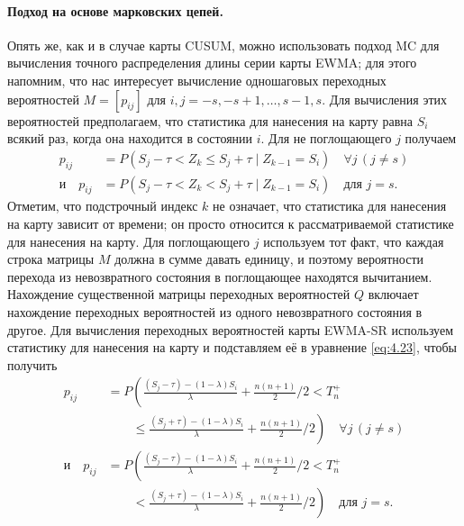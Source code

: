 \paragraph{Подход на основе марковских цепей.} Опять же, как и в случае карты CUSUM, можно использовать подход MC для вычисления точного распределения длины серии карты EWMA; для этого напомним, что нас интересует вычисление одношаговых переходных вероятностей \(M = [p_{ij}]\) для \(i, j = -s, -s + 1, \ldots, s - 1, s\). Для вычисления этих вероятностей предполагаем, что статистика для нанесения на карту равна \(S_i\) всякий раз, когда она находится в состоянии \(i\). Для не поглощающего \(j\) получаем
\begin{equation}
	\begin{aligned}
		p_{ij} &= P(S_j - \tau < Z_k \le S_j + \tau \mid Z_{k-1} = S_i) \quad \forall j\, (j \ne s) \\
		\text{и}\quad p_{ij} &= P(S_j - \tau < Z_k < S_j + \tau \mid Z_{k-1} = S_i) \quad \text{для } j = s.
	\end{aligned}
	\label{eq:4.23}
\end{equation}
Отметим, что подстрочный индекс \(k\) не означает, что статистика для нанесения на карту зависит от времени; он просто относится к рассматриваемой статистике для нанесения на карту. Для поглощающего \(j\) используем тот факт, что каждая строка матрицы \(M\) должна в сумме давать единицу, и поэтому вероятности перехода из невозвратного состояния в поглощающее находятся вычитанием. Нахождение существенной матрицы переходных вероятностей \(Q\) включает нахождение переходных вероятностей из одного невозвратного состояния в другое. Для вычисления переходных вероятностей карты EWMA-SR используем статистику для нанесения на карту и подставляем её в уравнение \eqref{eq:4.23}, чтобы получить
\begin{equation}
	\begin{aligned}
		p_{ij} &= P\left( \frac{(S_j - \tau) - (1 - \lambda)S_i}{\lambda} + \frac{n(n + 1)}{2} \Big/ 2 < T_n^+ \right. \\
		&\qquad \left. \le \frac{(S_j + \tau) - (1 - \lambda)S_i}{\lambda} + \frac{n(n + 1)}{2} \Big/ 2 \right) \quad \forall j\, (j \ne s) \\
		\text{и}\quad p_{ij} &= P\left( \frac{(S_j - \tau) - (1 - \lambda)S_i}{\lambda} + \frac{n(n + 1)}{2} \Big/ 2 < T_n^+ \right. \\
		&\qquad \left. < \frac{(S_j + \tau) - (1 - \lambda)S_i}{\lambda} + \frac{n(n + 1)}{2} \Big/ 2 \right) \quad \text{для } j = s.
	\end{aligned}
	\label{eq:4.24}
\end{equation}

